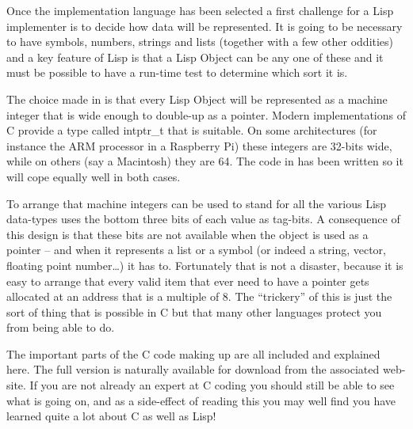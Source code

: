 Once the implementation language has been selected
a first challenge for a Lisp implementer is to decide how data will
be represented. It is going to be necessary to have symbols, numbers,
strings and lists (together with a few other oddities) and a key
feature of Lisp is that a Lisp Object can be any one of these and
it must be possible to have a run-time test to determine which sort
it is.

The choice made in \vsl{} is that every Lisp Object will be represented
as a machine integer that is wide enough to double-up as a pointer.
Modern implementations of C provide a type called {\tx intptr\_t} that
is suitable. On some architectures (for instance the ARM processor
in a Raspberry Pi) these integers are 32-bits wide, while on others
(say a Macintosh) they are 64. The code in \vsl{} has been written so it
will cope equally well in both cases.

To arrange that machine integers can be used to stand for all the various
Lisp data-types \vsl{} uses the bottom three bits of each value as
tag-bits. A consequence of this design is that these bits are not available
when the object is used as a pointer -- and when it represents
a list or a symbol (or indeed a string, vector, floating point number\ldots)
it has to. Fortunately that is not a disaster, because it is easy to arrange
that every valid item that \vsl{} ever need to have a pointer gets
allocated at an address that is a multiple of 8. The ``trickery'' of this
is just the sort of thing that is possible in C but that many other
languages protect you from being able to do.

The important parts of the C code making up \vsl{} are all included
and explained here. The full version is naturally available
for download from the associated web-site. If you are not already
an expert at C coding you should still be able to see what is going on,
and as a side-effect of reading this you may well find you have learned
quite a lot about C as well as Lisp!

